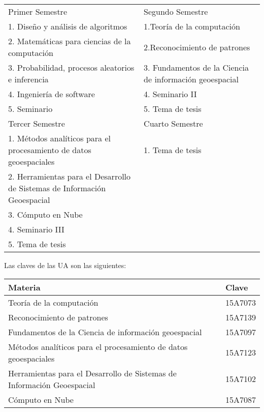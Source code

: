 \documentclass[runningheads,a4paper]{llncs}
\begin{document}
\begin{table}
\begin{center}
 \begin{tabular}{|p{7cm}|p{7cm}|}
\hline\noalign{\smallskip} Primer Semestre & Segundo Semestre\\
1. Diseño y análisis de algoritmos                  & 1.Teoría de la computación
\\
2. Matemáticas para ciencias de la computación      & 2.Reconocimiento de
patrones \\
3. Probabilidad, procesos aleatorios e inferencia   & 3. Fundamentos de la
Ciencia de información geoespacial \\
4. Ingeniería de software                           & 4. Seminario II\\
5. Seminario                                        & 5. Tema de tesis\\
\hline\noalign{\smallskip} Tercer Semestre & Cuarto Semestre\\
1. Métodos analíticos para el procesamiento de datos geoespaciales & 1. Tema de tesis\\
2. Herramientas para el Desarrollo de Sistemas de Información Geoespacial& \\
3. Cómputo en Nube  & \\
4. Seminario III& \\
5. Tema de tesis & \\
\hline
\end{tabular}
\end{center}
\end{table}

Las claves de las UA son las siguientes:

\begin{tabular}{ll}
    \hline
    Materia                                 & Clave \\
    \hline
    Teoría de la computación                & 15A7073 \\
    Reconocimiento de patrones              & 15A7139 \\
    Fundamentos de la Ciencia de información geoespacial & 15A7097 \\
    \hline
    Métodos analíticos para el procesamiento de datos geoespaciales & 15A7123 \\
    Herramientas para el Desarrollo de Sistemas de Información Geoespacial & 15A7102 \\
    Cómputo en Nube & 15A7087 \\
\hline
\end{tabular}
\end{document}
